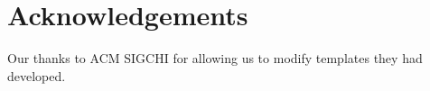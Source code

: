 \section{Acknowledgements}

Our thanks to ACM SIGCHI for allowing us to modify templates they had developed.